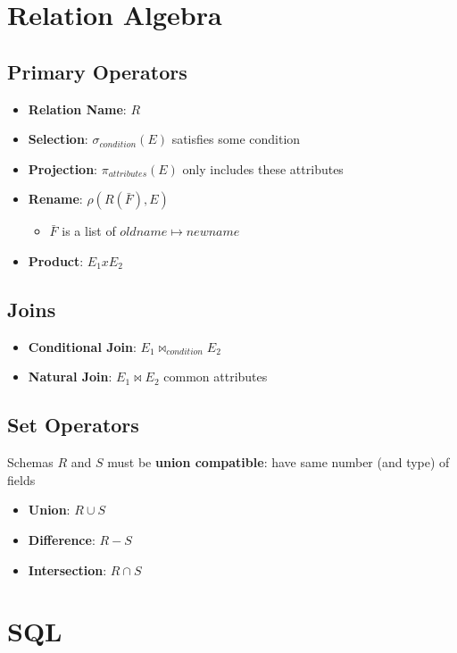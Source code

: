 \documentclass[]{article}
\theoremstyle{definition}
\begin{document}
	\section{Relation Algebra}
		\subsection{Primary Operators}
			\begin{itemize}
				\item \textbf{Relation Name}: $R$
				\item \textbf{Selection}: $\sigma_{condition}(E)$ satisfies some condition
				\item \textbf{Projection}: $\pi_{attributes}(E)$ only includes these attributes
				\item \textbf{Rename}: $\rho(R(\bar{F}),E)$
				\begin{itemize}
					\item $\bar{F}$ is a list of $oldname \mapsto newname$
				\end{itemize}
				\item \textbf{Product}: $E_1 x E_2$
			\end{itemize}	
		\subsection{Joins}
			\begin{itemize}
				\item \textbf{Conditional Join}: $E_1 \Join_{condition} E_2$
				\item \textbf{Natural Join}: $E_1 \Join E_2$ common attributes
			\end{itemize}			
		\subsection{Set Operators}
			Schemas $R$ and $S$ must be \textbf{union compatible}: have same number (and type) of fields
			\begin{itemize}
				\item \textbf{Union}: $R \cup S$
				\item \textbf{Difference}: $R - S$
				\item \textbf{Intersection}: $R \cap S$
			\end{itemize}															
	\section{SQL}
\end{document}
